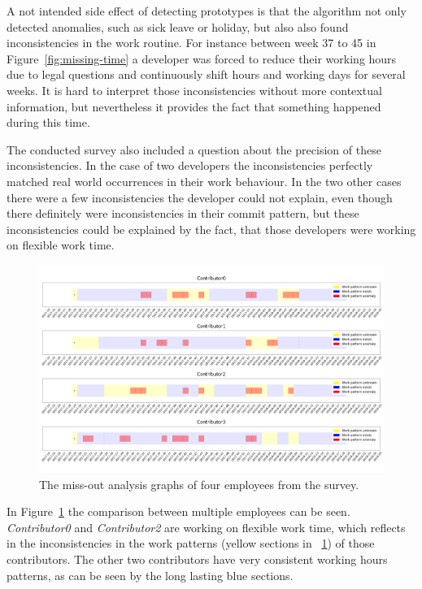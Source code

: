 A not intended side effect of detecting prototypes is that the algorithm not only detected anomalies, such as sick leave or holiday, but also also found inconsistencies in the work routine.
For instance between week 37 to 45 in Figure~\ref{fig:missing-time} a developer was forced to reduce their working hours due to legal questions and continuously shift hours and working days for several weeks.
It is hard to interpret those inconsistencies without more contextual information, but nevertheless it provides the fact that something happened during this time.

The conducted survey also included a question about the precision of these inconsistencies.
In the case of two developers the inconsistencies perfectly matched real world occurrences in their work behaviour.
In the two other cases there were a few inconsistencies the developer could not explain, even though there definitely were inconsistencies in their commit pattern, but these inconsistencies could be explained by the fact, that those developers were working on flexible work time.

\begin{figure}[H]
    \includegraphics[scale=0.20]{./graphs/analysis/work-time-analysis-comparison}
    \centering
    \caption{The miss-out analysis graphs of four employees from the survey.}\label{fig:miss-out-comparison}
\end{figure}

In Figure~\ref{fig:miss-out-comparison} the comparison between multiple employees can be seen.
\emph{Contributor0} and \emph{Contributor2} are working on flexible work time, which reflects in the inconsistencies in the work patterns (yellow sections in ~\ref{fig:miss-out-comparison}) of those contributors.
The other two contributors have very consistent working hours patterns, as can be seen by the long lasting blue sections.
